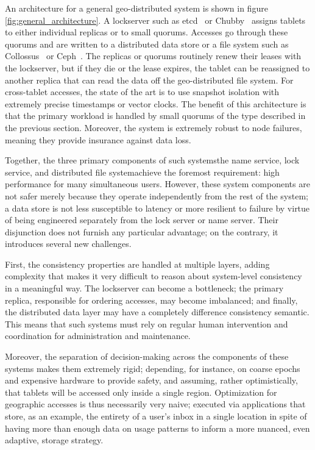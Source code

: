 \documentclass[sigplan,screen,review,anonymous,nonacm]{acmart}
\begin{document}
An architecture for a general geo-distributed system is shown in figure \ref{fig:general_architecture}.
A lockserver such as etcd~\cite{etcd_raft} or Chubby~\cite{chubby} assigns tablets to 
either individual replicas or to small quorums. 
Accesses go through these quorums and are written to a distributed data store or a file 
system such as Collossus~\cite{gfs} or Ceph~\cite{ceph}.  
The replicas or quorums routinely renew their leases with the lockserver, but if they die 
or the lease expires, the tablet can be reassigned to another replica that can read the 
data off the geo-distributed file system.
For cross-tablet accesses, the state of the art is to use snapshot isolation with 
extremely precise timestamps or vector clocks. 
The benefit of this architecture is that the primary workload is handled by small quorums 
of the type described in the previous section. 
Moreover, the system is extremely robust to node failures, meaning they provide insurance
against data loss.

Together, the three primary components of such systems\textemdash the name service, 
lock service, and distributed file system\textemdash achieve the foremost requirement: 
high performance for many simultaneous users.
However, these system components are not safer merely because they operate 
independently from the rest of the system; a data store is not less susceptible to 
latency or more resilient to failure by virtue of being engineered separately from 
the lock server or name server.
Their disjunction does not furnish any particular advantage; on the contrary, it
introduces several new challenges.

First, the consistency properties are handled at multiple layers, adding complexity
that makes it very difficult to reason about system-level consistency in a meaningful
way.
The lockserver can become a bottleneck; the primary replica, responsible for ordering
accesses, may become imbalanced; and finally, the distributed data layer may have a
completely difference consistency semantic.
This means that such systems must rely on regular human intervention and coordination 
for administration and maintenance.

Moreover, the separation of decision-making across the components of these systems makes
them extremely rigid; depending, for instance, on coarse epochs and expensive hardware 
to provide safety, and assuming, rather optimistically, that tablets will be accessed 
only inside a single region. 
Optimization for geographic accesses is thus necessarily very naive; executed via 
applications that store, as an example, the entirety of a user's inbox in a single 
location in spite of having more than enough data on usage patterns to inform a more 
nuanced, even adaptive, storage strategy.
\end{document}
